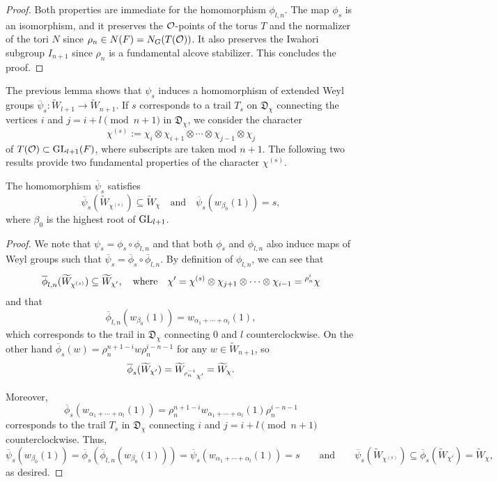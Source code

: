     \begin{proof}
        Both properties are immediate for the homomorphism $\phi_{l,n}$. The map $\phi_s$ is an isomorphism, and it preserves the $\mathcal{O}$-points of the torus $T$ and the normalizer of the tori $N$ since $\rho_n\in N(F)=N_G(T(\mathcal{O}))$. It also preserves the Iwahori subgroup $I_{n+1}$ since $\rho_n$ is a fundamental alcove stabilizer. This concludes the proof.
    \end{proof}

    The previous lemma shows that $\psi_s$ induces a homomorphism of extended Weyl groups $\overline{\psi}_s:\widetilde{W}_{l+1}\rightarrow\widetilde{W}_{n+1}$. If $s$ corresponds to a trail $T_s$ on $\mathfrak{D}_\chi$ connecting the vertices $i$ and $j=i+l\pmod{n+1}$ in $\mathfrak{D}_\chi$, we consider the character $$\chi^{(s)}:=\chi_i\otimes\chi_{i+1}\otimes\cdots\otimes\chi_{j-1}\otimes\chi_j$$
    of $T(\mathcal{O})\subset\mathrm{GL}_{l+1}(F)$, where subscripts are taken mod $n+1$. The following two results provide two fundamental properties of the character $\chi^{(s)}$.

    \begin{lemma}\label{lem_hompsi_s}
        The homomorphism $\overline{\psi}_s$ satisfies 
        \begin{equation*}
            \overline{\psi}_s(\widetilde{W}_{\chi^{(s)}})\subseteq\widetilde{W}_\chi\quad\text{and}\quad\overline{\psi}_s(w_{\beta_0}(1))=s,
        \end{equation*}
        where $\beta_0$ is the highest root of $\mathrm{GL}_{l+1}$.
    \end{lemma}
    \begin{proof}
        We note that $\psi_s=\phi_s\circ\phi_{l,n}$ and that both $\phi_s$ and $\phi_{l,n}$ also induce maps of Weyl groups such that 
        $\overline{\psi}_s=\overline{\phi}_s\circ\overline{\phi}_{l,n}$. 
        By definition of $\phi_{l,n}$, we can see that $$\overline{\phi}_{l,n}(\widetilde{W}_{\chi^{(s)}})\subseteq\widetilde{W}_{\chi'},\quad\text{where}\quad\chi'=\chi^{(s)}\otimes\chi_{j+1}\otimes\cdots\otimes\chi_{i-1}=\prescript{\rho_n^i}{}{\chi}$$
        and that 
        $$\overline{\phi}_{l,n}(w_{\beta_0}(1))=w_{\alpha_1+\cdots+\alpha_l}(1),$$ 
        which corresponds to the trail in $\mathfrak{D}_\chi$ connecting $0$ and $l$ counterclockwise. On the other hand $\overline{\phi}_s(w)=\rho_n^{n+1-i}w\rho_n^{i-n-1}$ for any $w\in\widetilde{W}_{n+1}$, so $$\overline{\phi}_s(\widetilde{W}_{\chi'})=\widetilde{W}_{\prescript{\rho_n^{-i}}{}{\chi'}}=\widetilde{W}_\chi.$$

        Moreover, 
        $$\overline{\phi}_s(w_{\alpha_1+\cdots+\alpha_l}(1))=\rho_n^{n+1-i}w_{\alpha_1+\cdots+\alpha_l}(1)\rho_n^{i-n-1}$$
        corresponds to the trail $T_s$ in $\mathfrak{D}_\chi$ connecting $i$ and $j=i+l\pmod{n+1}$ counterclockwise. Thus,
        $$\overline{\psi}_s(w_{\beta_0}(1))=\overline{\phi}_s(\overline{\phi}_{l,n}(w_{\beta_0}(1)))=\overline{\psi}_s(w_{\alpha_1+\cdots+\alpha_l}(1))=s\quad\quad\text{and}\quad\quad\overline{\psi}_s(\widetilde{W}_{\chi^{(s)}})\subseteq\overline{\phi}_s(\widetilde{W}_{\chi'})=\widetilde{W}_\chi,$$
        as desired.
    \end{proof}

